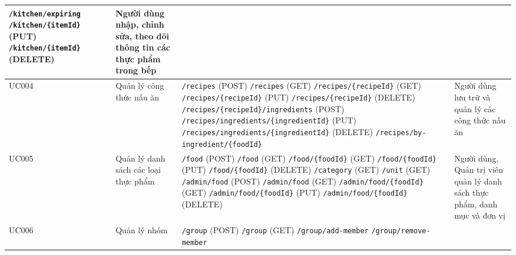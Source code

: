 \begin{longtable}{|>{\centering\arraybackslash}p{1.5cm}|>{\raggedright\arraybackslash}p{2.5cm}|>{\raggedright\arraybackslash}p{7cm}|>{\raggedright\arraybackslash}p{3cm}|}
\texttt{/kitchen/expiring} \newline
\texttt{/kitchen/\{itemId\}} (PUT) \newline
\texttt{/kitchen/\{itemId\}} (DELETE) & 
Người dùng nhập, chỉnh sửa, theo dõi thông tin các thực phẩm trong bếp \\
\hline
UC004 & Quản lý công thức nấu ăn & 
\texttt{/recipes} (POST) \newline
\texttt{/recipes} (GET) \newline
\texttt{/recipes/\{recipeId\}} (GET) \newline
\texttt{/recipes/\{recipeId\}} (PUT) \newline
\texttt{/recipes/\{recipeId\}} (DELETE) \newline
\texttt{/recipes/\{recipeId\}/ingredients} (POST) \newline
\texttt{/recipes/ingredients/\{ingredientId\}} (PUT) \newline
\texttt{/recipes/ingredients/\{ingredientId\}} (DELETE) \newline
\texttt{/recipes/by-ingredient/\{foodId\}} & 
Người dùng lưu trữ và quản lý các công thức nấu ăn \\
\hline
UC005 & Quản lý danh sách các loại thực phẩm & 
\texttt{/food} (POST) \newline
\texttt{/food} (GET) \newline
\texttt{/food/\{foodId\}} (GET) \newline
\texttt{/food/\{foodId\}} (PUT) \newline
\texttt{/food/\{foodId\}} (DELETE) \newline
\texttt{/category} (GET) \newline
\texttt{/unit} (GET) \newline
\texttt{/admin/food} (POST) \newline
\texttt{/admin/food} (GET) \newline
\texttt{/admin/food/\{foodId\}} (GET) \newline
\texttt{/admin/food/\{foodId\}} (PUT) \newline
\texttt{/admin/food/\{foodId\}} (DELETE) & 
Người dùng, Quản trị viên quản lý danh sách thực phẩm, danh mục và đơn vị \\
\hline
UC006 & Quản lý nhóm & 
\texttt{/group} (POST) \newline
\texttt{/group} (GET) \newline
\texttt{/group/add-member} \newline
\texttt{/group/remove-member} \newline

\end{longtable}
